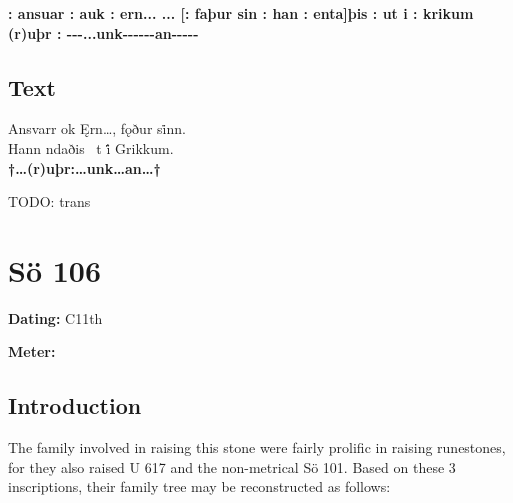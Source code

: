\textbf{: ansuar : auk : ern... ... [: faþur sin : han : enta]þis : ut i : krikum (r)uþr : -{}-{}-...unk-{}-{}-{}-{}-{}-an-{}-{}-{}-{}-}

\subsection{Text}

\bpg\bpa[0]%
Ansvarr ok Ęrn\dots, fǫður si̇nn. \\
Hann ndaðis \hld\ t i̇́ Grikkum. \\
\textbf{†\dots (r)uþr:\dots unk\dots an\dots †} \epa

\bpb TODO: trans\epb\epg

\sectionline\clearpage


\section{Sö 106}

\begin{flushright}%
\textbf{Dating:} C11th

\textbf{Meter:} \Fornyrdislag
\end{flushright}%

\subsection{Introduction}

The family involved in raising this stone were fairly prolific in raising runestones, for they also raised U 617 and the non-metrical Sö 101.  Based on these 3 inscriptions, their family tree may be reconstructed as follows:

\hspace{0.5cm}

